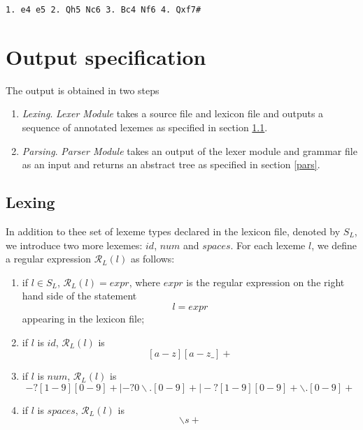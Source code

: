 \documentclass[a4paper,10pt]{article}
\newcounter{subsubsubsection}[subsubsection]
\begin{document}
\label{csf}
\begin{comment}
\begin{verbatim}

1. e4 c5 2. Nf3 d6 3. Bb5 Bd7 4. Bxd7 Qxd7 5. c4 Nc6 6. Nc3 Nf6 
7. 0-0 g6 8. d4 cxd4 9. Nxd4 Bg7 10. Nde2 Qe6  11. Nd5 Qxe4 
12. Nc7+ Kd7 13. Nxa8 Qxc4 14. Nb6+ axb6 15. Nc3 Ra8 16. a4 Ne4 
17. Nxe4 Qxe4 18. Qb3 f5 19. Bg5 Qb4 20. Qf7 Be5 21. h3 Rxa4 
22. Rxa4 Qxa4 23. Qxh7 Bxb2 24. Qxg6 Qe4 25. Qf7 Bd4 26. Qb3 f4 
27. Qf7 Be5 28. h4 b5 29. h5 Qc4 30. Qf5+ Qe6 31. Qxe6+ Kxe6 
32. g3 fxg3 33. fxg3 b4 34. Bf4 Bd4 
35. Kh1! b3 36. g4 Kd5 37. g5 e6 38. h6 Ne7 39. Rd1 e5 40. Be3 Kc4 
41. Bxd4 exd4 42. Kg2 b2 43. Kf3 Kc3 44. h7 Ng6 45. Ke4 Kc2 
46. Rh1 d3 47. Kf5 b1=Q 48. Rxb1 Kxb1 49. Kxg6 d2 50. h8=Q d1=Q 
51. Qh7 b5 52. Kf6 Kb2 53. Qh2 Ka1 54. Qf4 b4 55. Qxb4 Qf3+ 
56. Kg7 d5 57. Qd4 Kb1 58. g6 Qe4 59. Qg1 Kb2 60. Qf2+ Kc1 
61. Kf6 d4 62. g7 1-0 
\end{verbatim}
\end{comment}

\begin{verbatim}
1. e4 e5 2. Qh5 Nc6 3. Bc4 Nf6 4. Qxf7# 
\end{verbatim}

\section{Output specification}
The output is obtained in two steps
\begin{enumerate}
\item \textit{Lexing}.  \textit{Lexer Module} takes a source file and lexicon file and outputs a sequence of annotated lexemes as specified in section \ref{lex}.
\item \textit{Parsing}. \textit{Parser Module} takes an output of the lexer module and grammar file as an input and returns an abstract tree as specified in section \ref{pars}.
\end{enumerate}

\subsection{Lexing}\label{lex}
In addition to thee  set of lexeme types  declared in the lexicon file, denoted by $S_L$, we introduce two more lexemes: $id$, $num$ and $spaces$.  For each lexeme $l$, we define a regular expression $\mathcal{R}_L(l)$ as follows:

\begin{enumerate}
\item if $l \in S_L$, $\mathcal{R}_L(l) = expr$, where $expr$ is the regular expression  on the right hand side of the statement
$$l = expr$$
appearing in the lexicon file;
\item if $l$ is $id$, $\mathcal{R}_L(l)$ is 
                               $$[a-z][a-z\_]+$$
\item if $l$ is $num$, $\mathcal{R}_L(l)$ is  
                $$-?[1-9][0-9]+ |-?0\backslash.[0-9]+ | -?[1-9][0-9]+\backslash.[0-9]+$$ 
\item if $l$ is $spaces$, $\mathcal{R}_L(l)$ is  
                $$\backslash s+$$ 
\end{enumerate}
\end{document}

